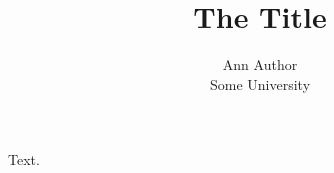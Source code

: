 \documentclass{cc}
\title{The Title}
\author{Ann Author\\ Some University}
\begin{document}
\maketitle
Text.
\end{document}
